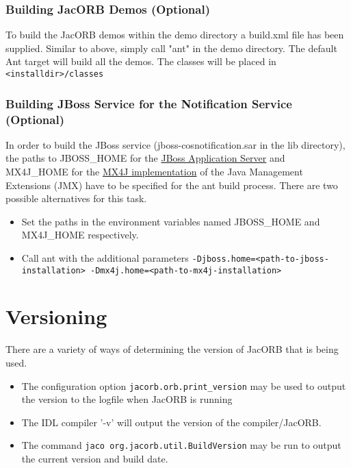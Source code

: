 \subsubsection{Building JacORB Demos (Optional)}
To build the JacORB demos within the demo directory a build.xml file
has been supplied. Similar to above, simply call "ant" in the demo directory.
The default Ant target will build all the demos. The classes will be placed
in {\tt <installdir>/classes}

\subsubsection{Building JBoss Service for the Notification Service (Optional)}
In order to build the JBoss service (jboss-cosnotification.sar in the lib
directory), the paths to JBOSS\_HOME for the
\href{http://www.jboss.org/jbossas}{JBoss Application Server} and MX4J\_HOME
for the \href{http://mx4j.sourceforge.net}{MX4J implementation}
 of the Java Management Extensions (JMX) have to be specified for the ant build
process. There are two possible alternatives for this task.
\begin{itemize}
\item Set the paths in the environment variables named JBOSS\_HOME and MX4J\_HOME respectively.
\item Call ant with the additional parameters {\tt -Djboss.home=<path-to-jboss-installation> -Dmx4j.home=<path-to-mx4j-installation>}
\end{itemize}


\section{Versioning}
There are a variety of ways of determining the version of JacORB that is being used.
\begin{itemize}
\item The configuration option {\tt jacorb.orb.print\_version} may be used to output the version to the logfile when JacORB is running
\item The IDL compiler '-v' will output the version of the compiler/JacORB.
\item The command {\tt jaco org.jacorb.util.BuildVersion} may be run to output the current version and build date.
\end{itemize}

